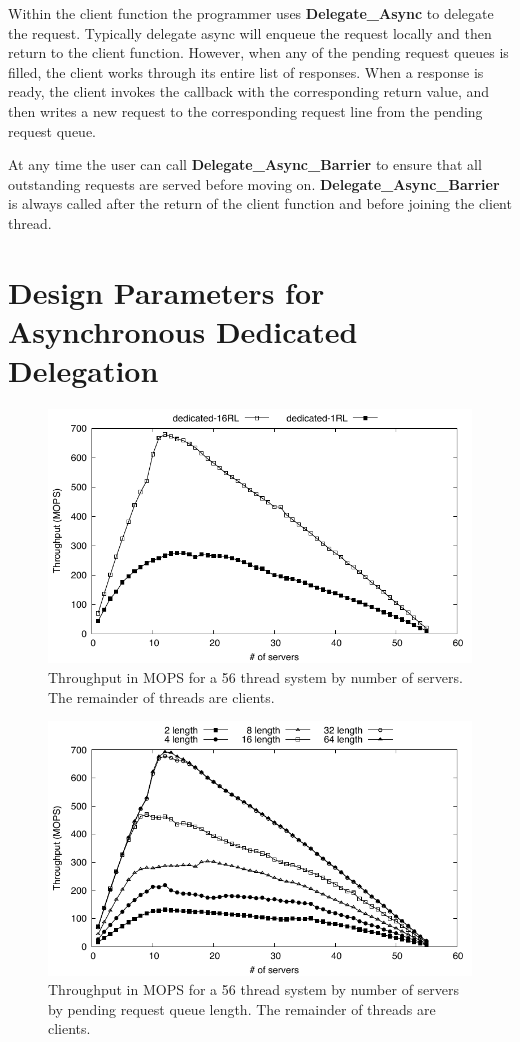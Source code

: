 \documentclass{uicthesi}
\begin{document}
Within the client function the programmer uses \textbf{Delegate\_Async} to delegate the request. Typically delegate async will enqueue the request locally and then return to the client function. However, when any of the pending request queues is filled, the client works through its entire list of responses. When a response is ready, the client invokes the callback with the corresponding return value, and then writes a new request to the corresponding request line from the pending request queue. 

At any time the user can call \textbf{Delegate\_Async\_Barrier} to ensure that all outstanding requests are served before moving on.  \textbf{Delegate\_Async\_Barrier} is always called after the return of the client function and before joining the client thread. 

\section{Design Parameters for Asynchronous Dedicated Delegation}
\begin{figure}[ht!]
\centering
\includegraphics[width=0.9\columnwidth]{FIG/dedicated_thput_client_server.pdf}
\caption{Throughput in MOPS for a 56 thread system by number of servers. The remainder of threads are clients.}
\label{fig:dedicated_thput_client_server}
\end{figure}

\begin{figure}[ht!]
\centering
\includegraphics[width=0.9\columnwidth]{FIG/vary_queue_length.pdf}
\caption{Throughput in MOPS for a 56 thread system by number of servers by pending request queue length. The remainder of threads are clients.}
\label{fig:dedicated_vary_queue}
\end{figure}
\end{document}
